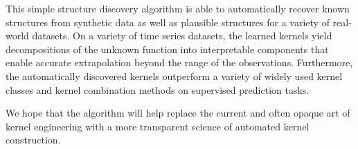 This simple structure discovery algorithm is able to automatically recover known structures from synthetic data as well as plausible structures for a variety of real-world datasets. 
On a variety of time series datasets, the learned kernels yield decompositions of the unknown function into interpretable components that enable accurate extrapolation beyond the range of the observations.
Furthermore, the automatically discovered kernels outperform a variety of widely used kernel classes and kernel combination methods on supervised prediction tasks.



We hope that the \procedurename{} algorithm will help replace the current and often opaque art of kernel engineering with a more transparent science of automated kernel construction.




